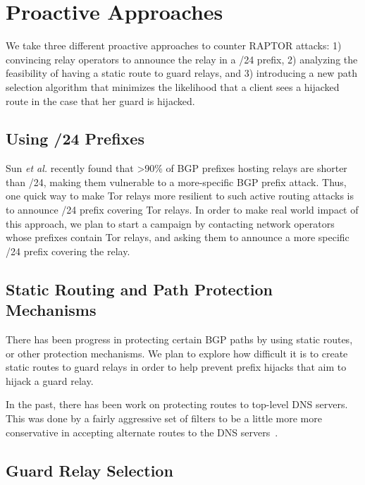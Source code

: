 \section{Proactive Approaches}
We take three different proactive approaches to counter RAPTOR attacks: 1) convincing relay operators to announce the relay in a /24 prefix, 2) analyzing the feasibility of having a static route to guard relays, and 3) introducing a new path selection algorithm that minimizes the likelihood that a client sees a hijacked route in the case that her guard is hijacked.

\subsection{Using /24 Prefixes}

Sun \emph{et al.} \cite{sun2015raptor} recently found that >90\% of BGP prefixes hosting relays are
shorter than /24, making them vulnerable to a more-specific BGP prefix attack. Thus, one quick way to make Tor relays more resilient to such active routing attacks is to announce /24 prefix covering Tor relays. In order to make real world impact of this approach, we plan to start a campaign by contacting network operators whose prefixes contain Tor relays, and asking them to announce a more specific /24 prefix covering the relay. 

\subsection{Static Routing and Path Protection Mechanisms}

There has been progress in protecting certain BGP paths by using static routes, or other protection mechanisms.  We plan to explore how difficult it is to create static routes to guard relays in order to help prevent prefix hijacks that aim to hijack a guard relay.  

In the past, there has been work on protecting routes to top-level DNS servers.  This was done by a fairly aggressive set of filters to be a little more more conservative in accepting alternate routes to the DNS servers~\cite{staticroute}.

\subsection{Guard Relay Selection}

